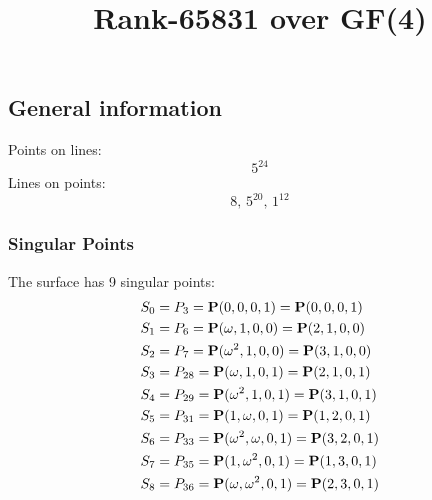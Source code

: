\documentclass{article}
\newcommand\setTBstruts{\def\T{\rule{0pt}{2.6ex}}%
\def\B{\rule[-1.2ex]{0pt}{0pt}}}
\newcommand{\bP}{{\bf P}}
\begin{document}
 
\setTBstruts



{\allowdisplaybreaks%






\title{Rank-65831 over GF(4)}
\author{}%
\maketitle%
%
{}



\subsection*{General information}
Points on lines:
$$
5^{24}$$
Lines on points:
$$
8,\,5^{20},\,1^{12}$$
\subsubsection*{Singular Points}
The surface has 9 singular points:\\
\begin{align*}
S_{0} &= P_{3}=\bP(0, 0, 0, 1) = \bP(0, 0, 0, 1)\\
S_{1} &= P_{6}=\bP(\omega , 1, 0, 0) = \bP(2, 1, 0, 0)\\
S_{2} &= P_{7}=\bP(\omega^{2}, 1, 0, 0) = \bP(3, 1, 0, 0)\\
S_{3} &= P_{28}=\bP(\omega , 1, 0, 1) = \bP(2, 1, 0, 1)\\
S_{4} &= P_{29}=\bP(\omega^{2}, 1, 0, 1) = \bP(3, 1, 0, 1)\\
S_{5} &= P_{31}=\bP(1, \omega , 0, 1) = \bP(1, 2, 0, 1)\\
S_{6} &= P_{33}=\bP(\omega^{2}, \omega , 0, 1) = \bP(3, 2, 0, 1)\\
S_{7} &= P_{35}=\bP(1, \omega^{2}, 0, 1) = \bP(1, 3, 0, 1)\\
S_{8} &= P_{36}=\bP(\omega , \omega^{2}, 0, 1) = \bP(2, 3, 0, 1)\\
\end{align*}
}
\end{document}
